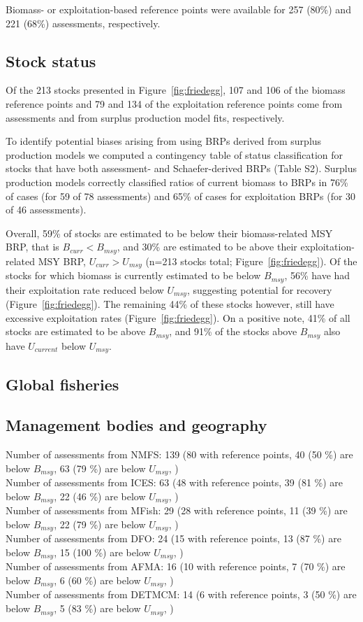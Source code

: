 Biomass- or exploitation-based reference points were available for
257 (80\%) and
221 (68\%)
assessments, respectively.

\subsection*{Stock status}
\noindent
Of the
213 stocks presented in
Figure~\ref{fig:friedegg}, 107 and
106 of the biomass reference points and
79 and
134 of the exploitation reference
points come from assessments and from surplus production model fits,
respectively.

To identify potential biases arising from using BRPs
derived from surplus production models we computed a contingency table
of status classification for stocks that have both assessment- and
Schaefer-derived BRPs (Table S2). Surplus production models correctly
classified ratios of current biomass to BRPs in
76\% of cases (for 59
of 78 assessments) and 65\%
of cases for exploitation BRPs (for 30 of
46 assessments).

Overall, 59\% of stocks are estimated
to be below their biomass-related MSY BRP, that is $B_{curr}<B_{msy}$,
and 30\% are estimated to be above
their exploitation-related MSY BRP, $U_{curr}>U_{msy}$
(n=213 stocks total; Figure~\ref{fig:friedegg}).
Of the stocks for which biomass is currently estimated to be below
$B_{msy}$, 56\% have had their
exploitation rate reduced below $U_{msy}$, suggesting potential for
recovery (Figure~\ref{fig:friedegg}). The remaining
44\% of these stocks however,
still have excessive exploitation rates
(Figure~\ref{fig:friedegg}). On a positive note,
41\% of all stocks are estimated to
be above $B_{msy}$, and 91\%
of the stocks above $B_{msy}$ also have $U_{current}$ below $U_{msy}$.


\subsection*{Global fisheries}

\subsection*{Management bodies and geography}
\noindent
Number of assessments from NMFS: 139 (80 with reference points, 40 (50 \%) are below $B_{msy}$, 63 (79 \%) are below $U_{msy}$, ) \\
Number of assessments from ICES: 63 (48 with reference points, 39 (81 \%) are below $B_{msy}$, 22 (46 \%) are below $U_{msy}$, ) \\
Number of assessments from MFish: 29 (28 with reference points, 11 (39 \%) are below $B_{msy}$, 22 (79 \%) are below $U_{msy}$, ) \\
Number of assessments from DFO: 24 (15 with reference points, 13 (87 \%) are below $B_{msy}$, 15 (100 \%) are below $U_{msy}$, ) \\
Number of assessments from AFMA: 16 (10 with reference points, 7 (70 \%) are below $B_{msy}$, 6 (60 \%) are below $U_{msy}$, ) \\
Number of assessments from DETMCM: 14 (6 with reference points, 3 (50 \%) are below $B_{msy}$, 5 (83 \%) are below $U_{msy}$, ) \\

